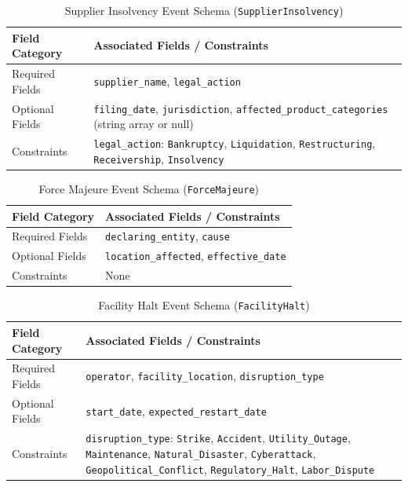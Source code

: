 \documentclass[11pt,a4paper]{article}
\begin{document}
\begin{table}[htbp]
\centering
\caption{Supplier Insolvency Event Schema (\texttt{SupplierInsolvency})}
\label{tab:schema_supplier_insolvency}
\begin{tabular}{@{}p{3.0cm} p{9.5cm}@{}}
\toprule
\textbf{Field Category} & \textbf{Associated Fields / Constraints} \\
\midrule
Required Fields & \texttt{supplier\_name}, \texttt{legal\_action} \\
Optional Fields & \texttt{filing\_date}, \texttt{jurisdiction}, \texttt{affected\_product\_categories} (string array or null) \\
Constraints & \texttt{legal\_action}: \texttt{Bankruptcy}, \texttt{Liquidation}, \texttt{Restructuring}, \texttt{Receivership}, \texttt{Insolvency} \\
\bottomrule
\end{tabular}
\end{table}

\begin{table}[htbp]
\centering
\caption{Force Majeure Event Schema (\texttt{ForceMajeure})}
\label{tab:schema_force_majeure}
\begin{tabular}{@{}p{3.0cm} p{9.5cm}@{}}
\toprule
\textbf{Field Category} & \textbf{Associated Fields / Constraints} \\
\midrule
Required Fields & \texttt{declaring\_entity}, \texttt{cause} \\
Optional Fields & \texttt{location\_affected}, \texttt{effective\_date} \\
Constraints & None \\
\bottomrule
\end{tabular}
\end{table}

\begin{table}[htbp]
\centering
\caption{Facility Halt Event Schema (\texttt{FacilityHalt})}
\label{tab:schema_facility_halt}
\begin{tabular}{@{}p{3.0cm} p{9.5cm}@{}}
\toprule
\textbf{Field Category} & \textbf{Associated Fields / Constraints} \\
\midrule
Required Fields & \texttt{operator}, \texttt{facility\_location}, \texttt{disruption\_type} \\
Optional Fields & \texttt{start\_date}, \texttt{expected\_restart\_date} \\
Constraints & \texttt{disruption\_type}: \texttt{Strike}, \texttt{Accident}, \texttt{Utility\_Outage}, \texttt{Maintenance}, \texttt{Natural\_Disaster}, \texttt{Cyberattack}, \texttt{Geopolitical\_Conflict}, \texttt{Regulatory\_Halt}, \texttt{Labor\_Dispute} \\
\bottomrule
\end{tabular}
\end{table}
\end{document}
